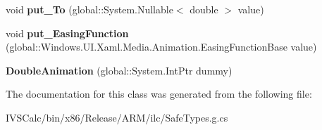 \begin{DoxyCompactItemize}
void {\bfseries put\+\_\+\+To} (global\+::\+System.\+Nullable$<$ double $>$ value)
\item 
\mbox{\label{class_windows_1_1_u_i_1_1_xaml_1_1_media_1_1_animation_1_1_double_animation_ae33c4929417c9a4a374d2d89fe8e28b5}} 
void {\bfseries put\+\_\+\+Easing\+Function} (global\+::\+Windows.\+U\+I.\+Xaml.\+Media.\+Animation.\+Easing\+Function\+Base value)
\item 
\mbox{\label{class_windows_1_1_u_i_1_1_xaml_1_1_media_1_1_animation_1_1_double_animation_a099940779e3426c3188f5741e607d183}} 
{\bfseries Double\+Animation} (global\+::\+System.\+Int\+Ptr dummy)
\end{DoxyCompactItemize}


The documentation for this class was generated from the following file\+:\begin{DoxyCompactItemize}
\item 
I\+V\+S\+Calc/bin/x86/\+Release/\+A\+R\+M/ilc/Safe\+Types.\+g.\+cs\end{DoxyCompactItemize}
